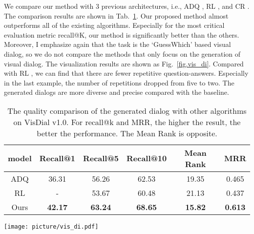 \documentclass[review]{elsarticle}
\begin{document}
	We compare our method with 3 previous architectures, i.e., ADQ \cite{DBLP:conf/emnlp/MurahariCBPD19}, RL \cite{DBLP:conf/iccv/DasKMLB17}, and CR \cite{DBLP:conf/atal/AgarwalGSLS19}. 
	The comparison results are shown in Tab.~\ref{Tab1}. Our proposed method almost outperforms all of the existing algorithms. Especially for the most critical evaluation metric recall@K, our method is significantly better than the others.   
	Moreover, I emphasize again that the task is the `GuessWhich' based visual dialog, so we do not compare the methods that only focus on the generation of visual dialog.
	The visualization results are shown as Fig.~\ref{fig.vis_di}. Compared with RL \cite{DBLP:conf/iccv/DasKMLB17}, we can find that there are fewer repetitive question-answers. Especially in the last example, the number of repetitions dropped from five to two. The generated dialogs are more diverse and precise compared with the baseline.
	\begin{table}[]
		\centering
		\label{my-label}
			\begin{tabular}{|c|c|c|c|c|c|}
				\hline
				model    & Recall@1 & Recall@5 & Recall@10 & Mean Rank & MRR   \\ \hline
				ADQ \cite{DBLP:conf/emnlp/MurahariCBPD19}      & 36.31    & 56.26    & 62.53     & 19.35     & 0.465 \\ \hline
				RL \cite{DBLP:conf/iccv/DasKMLB17}             & -         & 53.67    & 60.48     & 21.13     & 0.437 \\ \hline
				Ours                              & \textbf{42.17}    & \textbf{63.24}    & \textbf{68.65}     & \textbf{15.82}     & \textbf{0.613} \\ \hline
			\end{tabular}
		\caption{The quality comparison of the generated dialog with other algorithms on VisDial v1.0. For recall@k and MRR, the higher the result, the better the performance. The Mean Rank is opposite. }
		\label{Tab1}
	\end{table}
	
	\begin{figure*}[ht]
		\centering
		\texttt{[image: picture/vis\_di.pdf]}
		\centering 
		\caption{The qualitative results of our method for visual dialog.} 
		\label{fig.vis_di}
	\end{figure*}	
	
\end{document}
